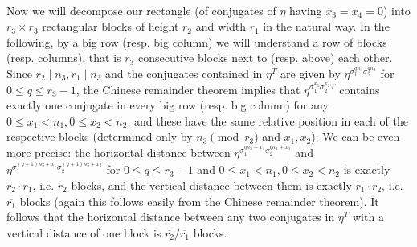\documentclass[12pt,a4paper]{article}
\theoremstyle{definition}
\newcommand{\Z}{\mathbb{Z}}
\newcommand{\uo}{\overline{r_2}}
\newcommand{\vo}{\overline{r_1}}
\begin{document}
\paragraph*{}
Now we will decompose our rectangle (of conjugates of $\eta$ having $x_3=x_4=0$) into $r_3\times r_3$ rectangular blocks of height $r_2$ and width $r_1$ in the natural way. In the following, by a big row (resp. big column) we will understand a row of blocks (resp. columns), that is $r_3$ consecutive blocks next to (resp. above) each other. Since $r_2\mid n_3, r_1\mid n_3$ and the conjugates contained in $\eta^T$ are given by $\eta^{\sigma_1^{qn_3}\sigma_2^{qn_3}}$ for $0\leq q \leq r_3-1$, the Chinese remainder theorem implies that $\eta^{\sigma_1^{x_1}\sigma_2^{x_2}T}$ contains exactly one conjugate in every big row (resp. big column) for any $0\leq x_1< n_1, 0\leq x_2< n_2$, and these have the same relative position in each of the respective blocks (determined only by $n_3 \pmod {r_3}$ and $x_1,x_2$). We can be even more precise: the horizontal distance between $\eta^{\sigma_1^{qn_3+x_1}\sigma_2^{qn_3+x_2}}$ and $\eta^ {\sigma_1^{(q+1)n_3+x_1}\sigma_2^{(q+1)n_3+x_2}}$ for $0\leq q \leq r_3-1$ and $0\leq x_1< n_1, 0\leq x_2< n_2$ is exactly $\uo\cdot r_1$, i.e. $\uo$ blocks, and the vertical distance between them is exactly $\vo\cdot r_2$, i.e. $\vo$ blocks (again this follows easily from the Chinese remainder theorem). It follows that the horizontal distance between any two conjugates in $\eta^T$ with a vertical distance of one block is $\uo/\vo$ blocks.
\end{document}
